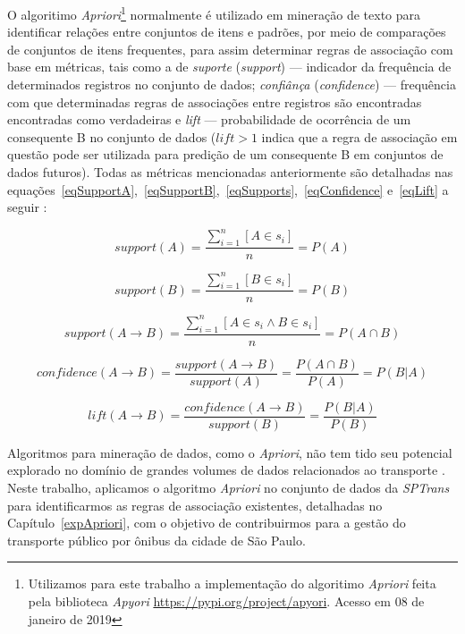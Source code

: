 \documentclass[
	12pt,				%
	oneside,			%
	a4paper,			%
	english,			%
	brazil				%
	]{abntex2ppgsi}
\begin{document}
{{{O algoritimo \textit{Apriori}\footnote{Utilizamos para este trabalho a implementação do algoritimo \textit{Apriori} feita pela biblioteca \textit{Apyori}  \url{https://pypi.org/project/apyori}. Acesso em 08 de janeiro de 2019} normalmente é utilizado em mineração de texto para identificar relações entre conjuntos de itens e padrões, por meio de comparações de conjuntos de itens frequentes, para assim determinar regras de associação com base em métricas, tais como a de \textit{suporte} (\textit{support}) --- indicador da frequência de determinados registros no conjunto de dados; \textit{confiânça} (\textit{confidence}) --- frequência com que determinadas regras de associações entre registros são encontradas encontradas como verdadeiras e \textit{lift} --- probabilidade de ocorrência de um consequente B no conjunto de dados ($lift > 1$ indica que a regra de associação em questão pode ser utilizada para predição de um consequente B em conjuntos de dados futuros). Todas as métricas mencionadas anteriormente são detalhadas nas equações~\ref{eqSupportA},~\ref{eqSupportB},~\ref{eqSupports},~\ref{eqConfidence} e~\ref{eqLift} a seguir  \cite{park2018apriori}:

\begin{equation}
\label{eqSupportA}
support(A) = \dfrac{\sum_{i=1}^{n}[A \in s_i]} {n} = P(A) 
\end{equation}

\begin{equation}
\label{eqSupportB}
support(B) = \dfrac{\sum_{i=1}^{n}[B \in s_i]} {n} = P(B) 
\end{equation}

\begin{equation}
\label{eqSupports}
support(A \rightarrow B) = \dfrac{\sum_{i=1}^{n}[A \in s_i \land B \in s_i]} {n} = P(A \cap B)
\end{equation}

\begin{equation}
\label{eqConfidence}
confidence(A \rightarrow B) = \dfrac{support(A \rightarrow B)}{support(A)} = \dfrac{P(A \cap B)}{P(A)} = P(B|A)
\end{equation}

\begin{equation}
\label{eqLift}
lift(A \rightarrow B) = \dfrac{confidence(A \rightarrow B)}{support(B)} = \dfrac{P(B|A)}{P(B)}
\end{equation}

Algoritmos para mineração de dados, como o \textit{Apriori}, não tem tido seu potencial explorado no domínio de grandes volumes de dados relacionados ao transporte \cite{park2018apriori}. Neste trabalho, aplicamos o algoritmo \textit{Apriori} no conjunto de dados da \textit{SPTrans} para identificarmos as regras de associação existentes, detalhadas no Capítulo~\ref{expApriori}, com o objetivo de contribuirmos para a gestão do transporte público por ônibus da cidade de São Paulo.   

}}}
\end{document}
